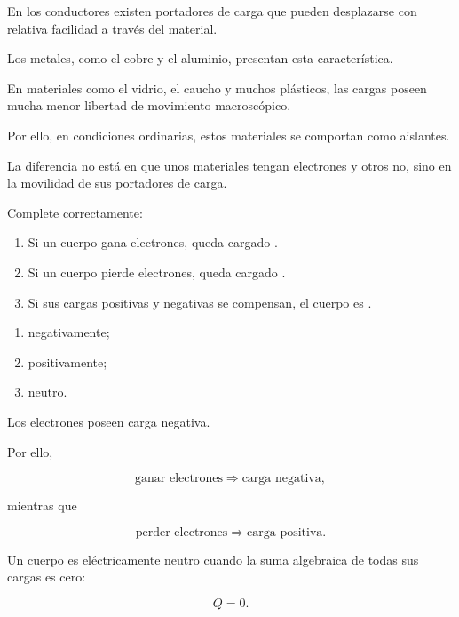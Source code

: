\begin{explicacion}

En los conductores existen portadores de carga que pueden desplazarse con
relativa facilidad a través del material.

Los metales, como el cobre y el aluminio, presentan esta característica.

En materiales como el vidrio, el caucho y muchos plásticos, las cargas poseen
mucha menor libertad de movimiento macroscópico.

Por ello, en condiciones ordinarias, estos materiales se comportan como
aislantes.

La diferencia no está en que unos materiales tengan electrones y otros no,
sino en la movilidad de sus portadores de carga.

\end{explicacion}



\begin{ejercicio}

Complete correctamente:

\begin{enumerate}
    \item Si un cuerpo gana electrones, queda cargado
    \underline{\hspace{2cm}}.
    \item Si un cuerpo pierde electrones, queda cargado
    \underline{\hspace{2cm}}.
    \item Si sus cargas positivas y negativas se compensan, el cuerpo es
    \underline{\hspace{2cm}}.
\end{enumerate}

\end{ejercicio}

\begin{respuesta}

\begin{enumerate}
    \item negativamente;
    \item positivamente;
    \item neutro.
\end{enumerate}

\end{respuesta}

\begin{explicacion}

Los electrones poseen carga negativa.

Por ello,

\[
\text{ganar electrones}
\Longrightarrow
\text{carga negativa},
\]

mientras que

\[
\text{perder electrones}
\Longrightarrow
\text{carga positiva}.
\]

Un cuerpo es eléctricamente neutro cuando la suma algebraica de todas sus
cargas es cero:

\[
Q=0.
\]

\end{explicacion}


